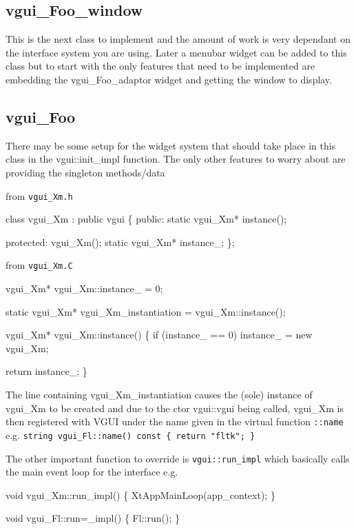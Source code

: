 \documentclass[12pt]{report} \usepackage{epsfig}
\begin{document}
\subsection{vgui\_Foo\_window}
 
This is the next class to implement and the amount of work is very dependant on the interface
system you are using.  Later a menubar widget can be added to this class but to start with 
the only features that need to be implemented are embedding the  vgui\_Foo\_adaptor widget 
and getting the window to display.

\subsection{vgui\_Foo}
 
There may be some setup for the widget system that should take place in this class in
the  vgui::init\_impl function.  The only other features to worry about are
providing the singleton methods/data

from {\tt vgui\_Xm.h}

{\scriptsize
\begin{verbawf} 
  class vgui\_Xm : public vgui 
  \{
  public:
    static vgui\_Xm* instance();
 
  protected:
    vgui\_Xm();
    static vgui\_Xm* instance\_;
  \};
\end{verbawf}
} 

from {\tt vgui\_Xm.C}

{\scriptsize
\begin{verbawf} 
  vgui\_Xm* vgui\_Xm::instance\_ = 0;
 
  static vgui\_Xm* vgui\_Xm\_instantiation = vgui\_Xm::instance();
 
  vgui\_Xm* vgui\_Xm::instance() 
  \{
    if (instance\_ == 0)
      instance\_ = new vgui\_Xm;
 
    return instance\_;
  \}
\end{verbawf}
} 

The line containing vgui\_Xm\_instantiation causes the (sole) instance of vgui\_Xm to be
created and due to the ctor  vgui::vgui being called, vgui\_Xm is then registered with
VGUI  under the name given in the virtual function {\tt ::name}
e.g.  {\tt string vgui\_Fl::name() const \{ return "fltk"; \} }

The other important function to override is {\tt vgui::run\_impl}
which basically calls the main event loop for the interface e.g.

{\scriptsize
\begin{verbawf} 
  void vgui\_Xm::run\_impl() 
  \{
    XtAppMainLoop(app\_context);
  \}
 
  void vgui\_Fl::run=\_impl() 
  \{
    Fl::run();
  \}
\end{verbawf}
}
 
\end{document}
